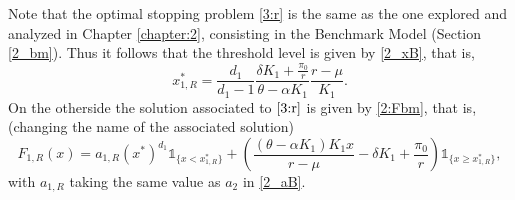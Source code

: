 Note that the optimal stopping problem \eqref{3:r} is the same as the one explored and analyzed in Chapter \ref{chapter:2}, consisting in the Benchmark Model (Section \ref{2_bm}).
Thus it follows that the threshold level is given by \eqref{2_xB}, that is,
\begin{equation}
x^*_{1,R}=\frac{d_1}{d_1-1} \frac{ \delta K_1  +\frac{\pi_0}{r} }{\theta-\alpha K_1} \frac{r-\mu}{K_1}.
\label{3_x1R}
\end{equation}
On the otherside the solution associated to $\eqref{3:r}$ is given by \eqref{2:Fbm}, that is, (changing the name of the associated solution)
\begin{equation}
F_{1,R}(x)= a_{1,R}(x^*)^{d_1} \mathds{1}_{ \{ x<x^*_{1,R}\}} +
\left(  \frac{(\theta-\alpha K_1)K_1 x}{r-\mu} - \delta K_1  +\frac{\pi_0}{r}\right)  \mathds{1}_{ \{ x \geq x^*_{1,R}\}},
\label{3:Fr}
\end{equation}
with $a_{1,R}$ taking the same value as $a_2$ in \eqref{2_aB}.
